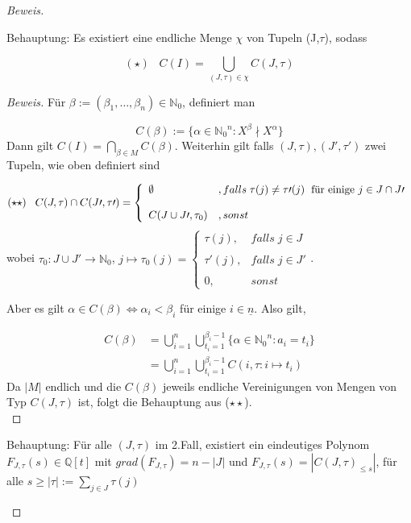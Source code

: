 \documentclass{article}
\newcommand*{\indx}[2]{{#1}_{#2}}
\newcommand*{\potx}[2]{{#1}^{#2}}
\newcommand*{\N}{\mathbb{N}_0}
\begin{document}
\begin{proof}[Beweis]
\begin{compactenum}
Behauptung: Es existiert eine endliche Menge $\chi$ von Tupeln (J,$\tau$), sodass 

\begin{displaymath}
(\star)\;\;\;   C(I)=\bigcup\limits_{(J,\tau)\in \chi} C(J,\tau)  
 \end{displaymath}

\begin{proof}[Beweis]
	Für $\beta:=(\indx{\beta}{1},\ldots,\indx{\beta}{n}) \in \N$, definiert man 
	
	\begin{displaymath}
	C(\beta):=\{\alpha\in \potx{\N}{n}: \potx{X}{\beta}\nmid\potx{X}{\alpha}\}
	\end{displaymath}
	Dann gilt $C(I)=\bigcap\limits_{\beta\in M}C(\beta)$. 
	Weiterhin gilt falls $(J,\tau),(J\prime,\tau\prime)$ zwei Tupeln, wie oben definiert sind
	
	\begin{displaymath}
	(\star \star)\;\;\;   C(J,\tau)\cap C(J\prime,\tau\prime)=\left\{\begin{array}{ll} \emptyset & ,falls  \;\tau(j)\neq\tau\prime(j)\; \textnormal{ für einige } j\in J\cap J\prime \\
	\\
	C(J\cup J\prime, \tau_0) & ,sonst \end{array}\right.
	\end{displaymath} 
	wobei $\indx{\tau}{0}:J\cup J\prime \longrightarrow \N$, $ j\mapsto \tau_{0}(j)=\left\{\begin{array}{ll} \tau(j), & falls\;  j \in J \\
	\\
	\tau\prime(j), & falls\;  j \in J\prime \\
	\\
	0, & sonst \end{array}\right.$.

	Aber es gilt $\alpha \in C(\beta)\Leftrightarrow \indx{\alpha}{i}<\indx{\beta}{i}$ für einige $i\in\underline{n}$. Also gilt,
 	

 	\begin{align*}
 	C(\beta)&=\bigcup\limits_{i=1}^{n}\bigcup\limits_{t_{i}=1}^{\indx{\beta}{i}-1}\{\alpha\in \potx{\N}{n}:\indx{a}{i}=\indx{t}{i}\}\\&
 	=\bigcup\limits_{i=1}^{n}\bigcup\limits_{t_{i}=1}^{\indx{\beta}{i}-1} C({i},\tau:i\mapsto \indx{t}{i})
 	\end{align*}
 	Da $\left|M\right|$ endlich und die $C(\beta)$ jeweils endliche Vereinigungen von Mengen von Typ $C(J,\tau)$ ist, folgt die Behauptung aus ($\star \star$).\\
\end{proof}
\item Behauptung: Für alle $(J,\tau)$ im 2.Fall, existiert ein eindeutiges Polynom $\indx{F}{J,\tau}(s)\in \mathbb{Q}[t]$ mit $grad(\indx{F}{J,\tau})=n-|J|$ und
$\indx{F}{J,\tau}(s)=\left|\indx{C(J,\tau)}{\leq s}\right|$, für alle $s\geq |\tau|:=\sum\limits_{j\in J}\tau(j)$\\


\end{compactenum}
\end{proof}
\end{document}
